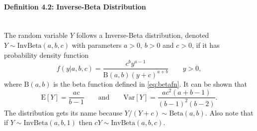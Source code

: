 \clearpage

\paragraph{Definition 4.2: Inverse-Beta Distribution}{~\\
The random variable $Y$ follows a Inverse-Beta distribution, denoted $Y\sim\mathrm{InvBeta}(a,b,c)$ with parameters $a>0$, $b>0$ and $c>0$,  if it has probability density function
$$
f(y|a,b,c)=\frac{c^by^{a-1}}{\mathrm{B}(a,b)(y+c)^{a+b}} \quad\quad y>0, 
$$
where $\mathrm{B}(a,b)$ is the beta function defined in
\eqref{eq:betafn}. It can be shown that
$$\text{E}[Y]=\frac{ac}{b-1}\quad\quad\text{and}\quad\quad \text{Var}[Y]=\frac{ac^2(a+b-1)}{(b-1)^2(b-2)}.$$
The distribution gets its name because $Y/(Y+c)\sim \mathrm{Beta}(a,b)$. Also note that if $Y\sim \mathrm{InvBeta}(a,b,1)$ then $cY\sim \mathrm{InvBeta}(a,b,c)$.}

\clearpage

